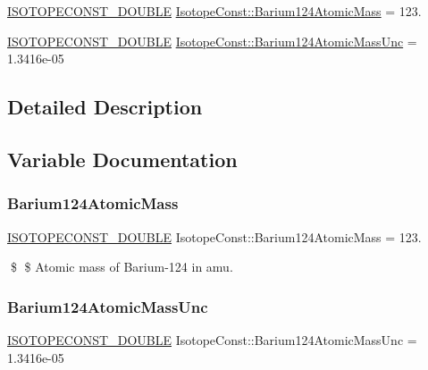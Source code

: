 \begin{DoxyCompactItemize}
\item 
\mbox{\hyperlink{group___isotope_const-_macros_ga8f45a7272ce02c0b4c65c44636ed719a}{I\+S\+O\+T\+O\+P\+E\+C\+O\+N\+S\+T\+\_\+\+D\+O\+U\+B\+LE}} \mbox{\hyperlink{group___isotope_const-_barium-_ba124_ga0a54aebe24d472e461f24c0104f2d124}{Isotope\+Const\+::\+Barium124\+Atomic\+Mass}} = 123.
\item 
\mbox{\hyperlink{group___isotope_const-_macros_ga8f45a7272ce02c0b4c65c44636ed719a}{I\+S\+O\+T\+O\+P\+E\+C\+O\+N\+S\+T\+\_\+\+D\+O\+U\+B\+LE}} \mbox{\hyperlink{group___isotope_const-_barium-_ba124_gad9e645ad6dd7fbc3bb654b3e53614f12}{Isotope\+Const\+::\+Barium124\+Atomic\+Mass\+Unc}} = 1.\+3416e-\/05
\end{DoxyCompactItemize}


\subsection{Detailed Description}


\subsection{Variable Documentation}
\mbox{\label{group___isotope_const-_barium-_ba124_ga0a54aebe24d472e461f24c0104f2d124}} 
\subsubsection{\texorpdfstring{Barium124\+Atomic\+Mass}{Barium124AtomicMass}}
{\footnotesize\ttfamily \mbox{\hyperlink{group___isotope_const-_macros_ga8f45a7272ce02c0b4c65c44636ed719a}{I\+S\+O\+T\+O\+P\+E\+C\+O\+N\+S\+T\+\_\+\+D\+O\+U\+B\+LE}} Isotope\+Const\+::\+Barium124\+Atomic\+Mass = 123.}

\$ \$ Atomic mass of Barium-\/124 in amu. \mbox{\label{group___isotope_const-_barium-_ba124_gad9e645ad6dd7fbc3bb654b3e53614f12}} 
\subsubsection{\texorpdfstring{Barium124\+Atomic\+Mass\+Unc}{Barium124AtomicMassUnc}}
{\footnotesize\ttfamily \mbox{\hyperlink{group___isotope_const-_macros_ga8f45a7272ce02c0b4c65c44636ed719a}{I\+S\+O\+T\+O\+P\+E\+C\+O\+N\+S\+T\+\_\+\+D\+O\+U\+B\+LE}} Isotope\+Const\+::\+Barium124\+Atomic\+Mass\+Unc = 1.\+3416e-\/05}

